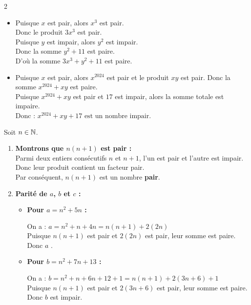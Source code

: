 \documentclass[10pt, a4paper]{article}
\begin{document}
\begin{multicols*}{2}
\begin{Solution}[APPLICATION][2]
\begin{itemize}[leftmargin=*,itemsep=0.5pt]
    \item Puisque $x$ est pair, alors $x^3$ est pair. \\
    Donc le produit $3x^3$ est pair. \\
    Puisque $y$ est impair, alors $y^2$ est impair. \\
    Donc la somme $y^2 + 11$ est paire. \\
    D'où la somme $3x^3 + y^2 + 11$ est paire.

    \item Puisque $x$ est pair, alors $x^{2024}$ est pair et le produit $xy$ est pair. 
    Donc la somme $x^{2024} + xy$ est paire. \\
    Puisque $x^{2024} + xy$ est pair et $17$ est impair, alors la somme totale est impaire. \\
    Donc : \quad $x^{2024} + xy + 17 \text{ est un nombre impair.}$
\end{itemize}
\end{Solution}

\begin{Solution}[APPLICATION][3]
Soit $n \in \mathbb{N}$.
\begin{enumerate}[leftmargin=*,itemsep=0.5pt]
    \item \textbf{Montrons que $n(n+1)$ est pair :} \\
    Parmi deux entiers consécutifs $n$ et $n+1$, l'un est pair et l'autre est impair. 
    Donc leur produit contient un facteur pair. \\
    Par conséquent, $n(n+1)$ est un nombre \textbf{pair}.

    \item \textbf{Parité de $a$, $b$ et $c$ :}
    \begin{itemize}[leftmargin=*,itemsep=0.5pt]
        \item \textbf{Pour $a = n^2 + 5n$ :}

        On a : $a = n^2 + n + 4n = n(n+1) + 2(2n)$ \\
        Puisque $n(n+1)$ est pair et $2(2n)$ est pair, leur somme est paire. 
        Donc $a$ .

        \item \textbf{Pour $b = n^2 + 7n + 13$ :}

        On a : $b = n^2 + n + 6n + 12 + 1 = n(n+1) + 2(3n + 6) + 1$ \\
        Puisque $n(n+1)$ est pair et $2(3n+6)$ est pair, leur somme est paire. 
        Donc $b$ est impair.


\end{itemize}
\end{enumerate}
\end{Solution}
\end{multicols*}
\end{document}
